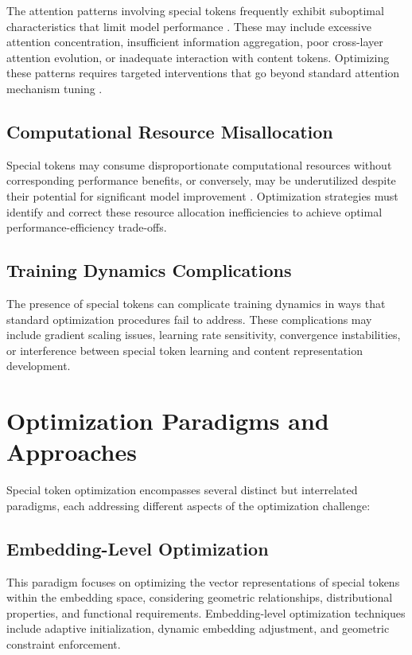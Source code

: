 The attention patterns involving special tokens frequently exhibit suboptimal characteristics that limit model performance \citep{child2019generating, zaheer2020big}. These may include excessive attention concentration, insufficient information aggregation, poor cross-layer attention evolution, or inadequate interaction with content tokens. Optimizing these patterns requires targeted interventions that go beyond standard attention mechanism tuning \citep{dao2022flashattention}.

\subsection{Computational Resource Misallocation}

Special tokens may consume disproportionate computational resources without corresponding performance benefits, or conversely, may be underutilized despite their potential for significant model improvement \citep{fedus2022switch, tay2022efficient}. Optimization strategies must identify and correct these resource allocation inefficiencies to achieve optimal performance-efficiency trade-offs.

\subsection{Training Dynamics Complications}

The presence of special tokens can complicate training dynamics in ways that standard optimization procedures fail to address. These complications may include gradient scaling issues, learning rate sensitivity, convergence instabilities, or interference between special token learning and content representation development.

\section{Optimization Paradigms and Approaches}

Special token optimization encompasses several distinct but interrelated paradigms, each addressing different aspects of the optimization challenge:

\subsection{Embedding-Level Optimization}

This paradigm focuses on optimizing the vector representations of special tokens within the embedding space, considering geometric relationships, distributional properties, and functional requirements. Embedding-level optimization techniques include adaptive initialization, dynamic embedding adjustment, and geometric constraint enforcement.

